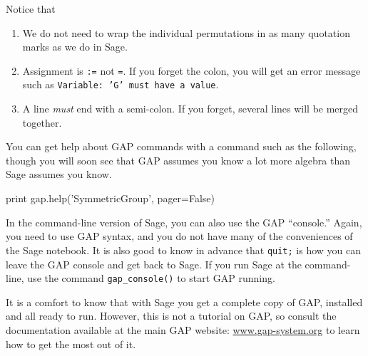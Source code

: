 %
Notice that
%
\begin{enumerate}
\item We do not need to wrap the individual permutations in as many quotation marks as we do in Sage.
\item Assignment is \verb?:=? not \verb?=?.  If you forget the colon, you will get an error message such as \texttt{Variable: 'G' must have a value}.
\item A line \emph{must} end with a semi-colon.  If you forget, several lines will be merged together.
\end{enumerate}
%
You can get help about GAP commands with a command such as the following, though you will soon see that GAP assumes you know a lot more algebra than Sage assumes you know.
%
\begin{sageverbatim}
print gap.help('SymmetricGroup', pager=False)
\end{sageverbatim}
%
In the command-line version of Sage, you can also use the GAP ``console.''  Again, you need to use GAP syntax, and you do not have many of the conveniences of the Sage notebook.  It is also good to know in advance that \verb?quit;? is how you can leave the GAP console and get back to Sage.  If you run Sage at the command-line, use the command \verb?gap_console()? to start GAP running.\par
%
It is a comfort to know that with Sage you get a complete copy of GAP, installed and all ready to run.  However, this is not a tutorial on GAP, so consult the documentation available at the main GAP website: \url{www.gap-system.org} to learn how to get the most out of it.
%
\begin{sageverbatim}
\end{sageverbatim}
%

